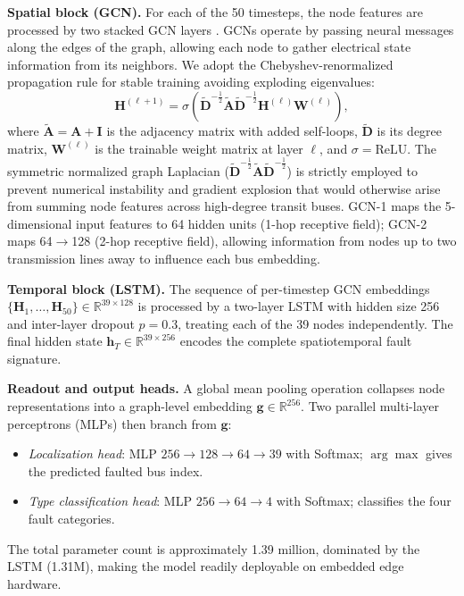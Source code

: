 \documentclass[conference]{IEEEtran}
\begin{document}
\textbf{Spatial block (GCN).}
For each of the 50 timesteps, the node features are processed by two stacked GCN
layers \cite{kipf2017}. GCNs operate by passing neural messages along the edges of the
graph, allowing each node to gather electrical state information from its neighbors.
We adopt the Chebyshev-renormalized propagation rule for stable training avoiding
exploding eigenvalues:
\begin{equation}
  \mathbf{H}^{(\ell+1)} = \sigma\!\left(
    \tilde{\mathbf{D}}^{-\frac{1}{2}}
    \tilde{\mathbf{A}}
    \tilde{\mathbf{D}}^{-\frac{1}{2}}
    \mathbf{H}^{(\ell)}
    \mathbf{W}^{(\ell)}
  \right),
  \label{eq:gcn}
\end{equation}
where $\tilde{\mathbf{A}} = \mathbf{A} + \mathbf{I}$ is the adjacency matrix with
added self-loops, $\tilde{\mathbf{D}}$ is its degree matrix, $\mathbf{W}^{(\ell)}$ is
the trainable weight matrix at layer $\ell$, and $\sigma = \mathrm{ReLU}$. The symmetric normalized
graph Laplacian ($\tilde{\mathbf{D}}^{-\frac{1}{2}} \tilde{\mathbf{A}} \tilde{\mathbf{D}}^{-\frac{1}{2}}$)
is strictly employed to prevent numerical instability and gradient explosion that would otherwise arise
from summing node features across high-degree transit buses. GCN-1
maps the 5-dimensional input features to 64 hidden units (1-hop receptive field);
GCN-2 maps 64$\to$128 (2-hop receptive field), allowing information from nodes up
to two transmission lines away to influence each bus embedding.

\textbf{Temporal block (LSTM).}
The sequence of per-timestep GCN embeddings
$\{\mathbf{H}_1, \ldots, \mathbf{H}_{50}\} \in \mathbb{R}^{39 \times 128}$
is processed by a two-layer LSTM \cite{hochreiter1997} with hidden size 256 and
inter-layer dropout $p = 0.3$, treating each of the 39 nodes independently. The final
hidden state $\mathbf{h}_T \in \mathbb{R}^{39 \times 256}$ encodes the complete
spatiotemporal fault signature.

\textbf{Readout and output heads.}
A global mean pooling operation collapses node representations into a graph-level
embedding $\mathbf{g} \in \mathbb{R}^{256}$. Two parallel multi-layer perceptrons
(MLPs) then branch from $\mathbf{g}$:
\begin{itemize}
  \item \emph{Localization head}: MLP $256 \to 128 \to 64 \to 39$ with Softmax;
        $\arg\max$ gives the predicted faulted bus index.
  \item \emph{Type classification head}: MLP $256 \to 64 \to 4$ with Softmax;
        classifies the four fault categories.
\end{itemize}
The total parameter count is approximately 1.39 million, dominated by the LSTM
(1.31M), making the model readily deployable on embedded edge hardware.
\end{document}
